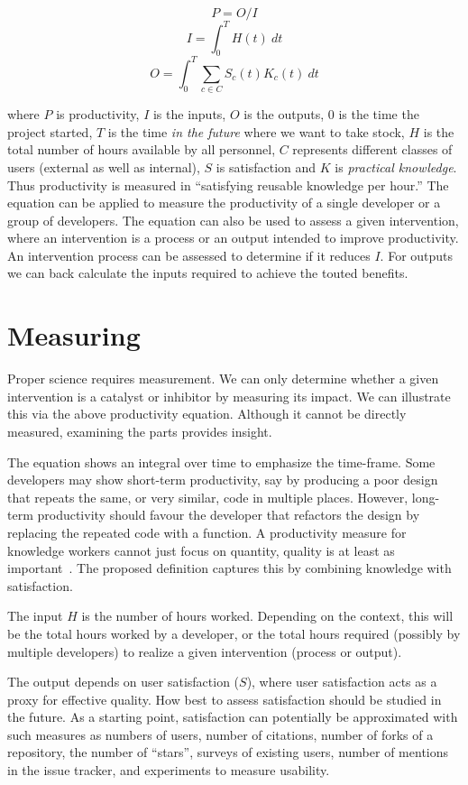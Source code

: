 \documentclass[sigconf, authorversion, nonacm]{acmart}
\begin{document}
$$P = O / I$$ 
$$ I = \int_{0}^{T} H(t)\ dt $$
$$ O = \int_{0}^{T} \sum_{c \in C} S_c(t) K_c(t)\ dt $$

\noindent where $P$ is productivity, $I$ is the inputs, $O$ is the outputs, $0$
is the time the project started, $T$ is the time \emph{in the future} where we
want to take stock, $H$ is the total number of hours available by all personnel,
$C$ represents different classes of users (external as well as internal), $S$ is
satisfaction and $K$ is \emph{practical knowledge}.  Thus productivity is
measured in ``satisfying reusable knowledge per hour.''  The equation can be
applied to measure the productivity of a single developer or a group of
developers. The equation can also be used to assess a given intervention, where
an intervention is a process or an output intended to improve productivity.  An
intervention process can be assessed to determine if it reduces $I$.  For
outputs we can back calculate the inputs required to achieve the touted
benefits.

\section{Measuring}

Proper science requires measurement.  We can only determine whether a given
intervention is a catalyst or inhibitor by measuring its impact.  We can
illustrate this via the above productivity equation.  Although it cannot be
directly measured, examining the parts provides insight.

The equation shows an integral over time to emphasize the time-frame.  Some
developers may show short-term productivity, say by producing a poor design that
repeats the same, or very similar, code in multiple places. However, long-term
productivity should favour the developer that refactors the design by replacing
the repeated code with a function. A productivity measure for knowledge workers
cannot just focus on quantity, quality is at least as
important~\cite{Drucker1999}.  The proposed definition captures this by
combining knowledge with satisfaction.

The input $H$ is the number of hours worked.  Depending on the context, this
will be the total hours worked by a developer, or the total hours required
(possibly by multiple developers) to realize a given intervention (process or
output).

The output depends on user satisfaction ($S$), where user satisfaction acts as a
proxy for effective quality. How best to assess satisfaction should be studied
in the future.  As a starting point, satisfaction can potentially be
approximated with such measures as numbers of users, number of citations, number
of forks of a repository, the number of ``stars'', surveys of existing users,
number of mentions in the issue tracker, and experiments to measure usability.
\end{document}
